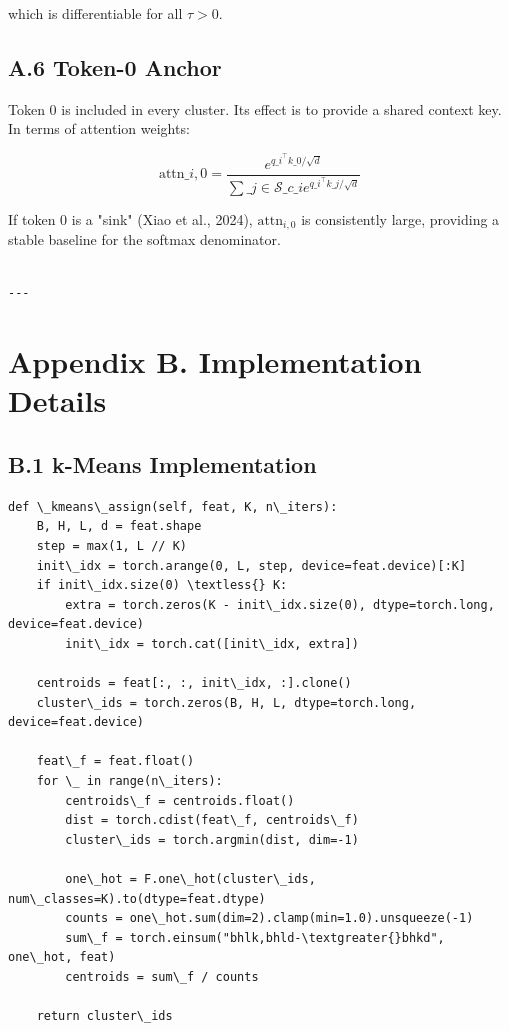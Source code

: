 which is differentiable for all $\tau > 0$.

\subsection{A.6 Token-0 Anchor}

Token 0 is included in every cluster. Its effect is to provide a shared 
context key. In terms of attention weights:

\[
\text{attn}\_{i,0} = \frac{e^{q\_i^\top k\_0 / \sqrt{d}}}{\sum\_{j \in \mathcal{S}\_{c\_i}} e^{q\_i^\top k\_j / \sqrt{d}}}
\tag{A.8}
\]

If token 0 is a "sink" (Xiao et al., 2024), $\text{attn}_{i,0}$ is 
consistently large, providing a stable baseline for the softmax denominator.
\begin{lstlisting}

---
\end{lstlisting}


\section{Appendix B. Implementation Details}

\subsection{B.1 k-Means Implementation}

\begin{lstlisting}
def \_kmeans\_assign(self, feat, K, n\_iters):
    B, H, L, d = feat.shape
    step = max(1, L // K)
    init\_idx = torch.arange(0, L, step, device=feat.device)[:K]
    if init\_idx.size(0) \textless{} K:
        extra = torch.zeros(K - init\_idx.size(0), dtype=torch.long, device=feat.device)
        init\_idx = torch.cat([init\_idx, extra])

    centroids = feat[:, :, init\_idx, :].clone()
    cluster\_ids = torch.zeros(B, H, L, dtype=torch.long, device=feat.device)

    feat\_f = feat.float()
    for \_ in range(n\_iters):
        centroids\_f = centroids.float()
        dist = torch.cdist(feat\_f, centroids\_f)
        cluster\_ids = torch.argmin(dist, dim=-1)

        one\_hot = F.one\_hot(cluster\_ids, num\_classes=K).to(dtype=feat.dtype)
        counts = one\_hot.sum(dim=2).clamp(min=1.0).unsqueeze(-1)
        sum\_f = torch.einsum("bhlk,bhld-\textgreater{}bhkd", one\_hot, feat)
        centroids = sum\_f / counts

    return cluster\_ids
\end{lstlisting}

